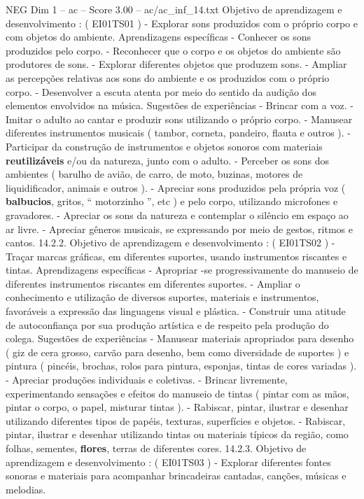 \begin{textsample}{NEG Dim 1 – ac – Score 3.00 – ac/ac\_inf\_14.txt}
Objetivo de aprendizagem e desenvolvimento : ( EI01TS01 ) - Explorar sons produzidos com o próprio corpo e com objetos do ambiente.
Aprendizagens específicas - Conhecer os sons produzidos pelo corpo. - Reconhecer que o corpo e os objetos do ambiente são produtores de sons. - Explorar diferentes objetos que produzem sons. - Ampliar as percepções relativas aos sons do ambiente e os produzidos com o próprio corpo. - Desenvolver a escuta atenta por meio do sentido da audição dos elementos envolvidos na música.
Sugestões de experiências - Brincar com a voz. - Imitar o adulto ao cantar e produzir sons utilizando o próprio corpo. - Manusear diferentes instrumentos musicais ( tambor, corneta, pandeiro, flauta e outros ). - Participar da construção de instrumentos e objetos sonoros com materiais \textbf{reutilizáveis} e/ou da natureza, junto com o adulto. - Perceber os sons dos ambientes ( barulho de avião, de carro, de moto, buzinas, motores de liquidificador, animais e outros ). - Apreciar sons produzidos pela própria voz ( \textbf{balbucios}, gritos, “ motorzinho ”, etc ) e pelo corpo, utilizando microfones e gravadores. - Apreciar os sons da natureza e contemplar o silêncio em espaço ao ar livre. - Apreciar gêneros musicais, se expressando por meio de gestos, ritmos e cantos. 14.2.2.
Objetivo de aprendizagem e desenvolvimento : ( EI01TS02 ) - Traçar marcas gráficas, em diferentes suportes, usando instrumentos riscantes e tintas.
Aprendizagens específicas - Apropriar -se progressivamente do manuseio de diferentes instrumentos riscantes em diferentes suportes. - Ampliar o conhecimento e utilização de diversos suportes, materiais e instrumentos, favoráveis a expressão das linguagens visual e plástica. - Construir uma atitude de autoconfiança por sua produção artística e de respeito pela produção do colega.
Sugestões de experiências - Manusear materiais apropriados para desenho ( giz de cera grosso, carvão para desenho, bem como diversidade de suportes ) e pintura ( pincéis, brochas, rolos para pintura, esponjas, tintas de cores variadas ). - Apreciar produções individuais e coletivas. - Brincar livremente, experimentando sensações e efeitos do manuseio de tintas ( pintar com as mãos, pintar o corpo, o papel, misturar tintas ). - Rabiscar, pintar, ilustrar e desenhar utilizando diferentes tipos de papéis, texturas, superfícies e objetos. - Rabiscar, pintar, ilustrar e desenhar utilizando tintas ou materiais típicos da região, como folhas, sementes, \textbf{flores}, terras de diferentes cores. 14.2.3.
Objetivo de aprendizagem e desenvolvimento : ( EI01TS03 ) - Explorar diferentes fontes sonoras e materiais para acompanhar brincadeiras cantadas, canções, músicas e melodias.

\end{textsample}

